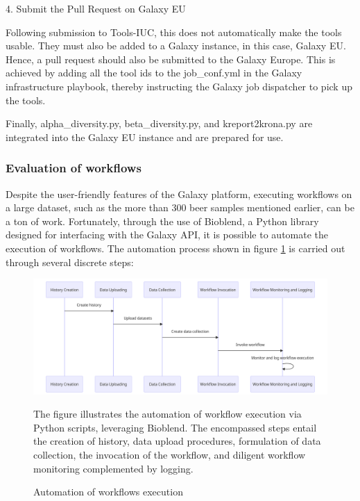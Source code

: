             4. Submit the Pull Request on Galaxy EU
            
            Following submission to Tools-IUC, this does not automatically make the tools usable. They must also be added to a Galaxy instance, in this case, Galaxy EU. Hence, a pull request should also be submitted to the Galaxy Europe. This is achieved by adding all the tool ids to the job\_conf.yml in the Galaxy infrastructure playbook, thereby instructing the Galaxy job dispatcher to pick up the tools.
            
            Finally, alpha\_diversity.py, beta\_diversity.py, and kreport2krona.py are integrated into the Galaxy EU instance and are prepared for use.

        
        \subsubsection{Evaluation of workflows}

            Despite the user-friendly features of the Galaxy platform, executing workflows on a large dataset, such as the more than 300 beer samples mentioned earlier, can be a ton of work. Fortunately, through the use of Bioblend, a Python library designed for interfacing with the Galaxy API, it is possible to automate the execution of workflows. The automation process shown in figure \ref{fig:methods:evaluation_of_workflows} is carried out through several discrete steps:
            
            \begin{figure}[H]
                \centering
                \includegraphics[scale=0.11]{images/evaluation_of_workflows.png}
                \caption{Automation of workflows execution}
                \label{fig:methods:evaluation_of_workflows}
                \small The figure illustrates the automation of workflow execution via Python scripts, leveraging Bioblend. The encompassed steps entail the creation of history, data upload procedures, formulation of data collection, the invocation of the workflow, and diligent workflow monitoring complemented by logging.
            \end{figure}   

